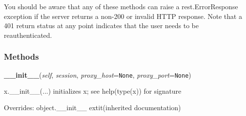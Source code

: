 You should be aware that any of these methods can raise a 
rest.ErrorResponse exception if the server returns a non-200 or invalid 
HTTP response. Note that a 401 return status at any point indicates that 
the user needs to be reauthenticated.



  \subsubsection{Methods}

    \vspace{0.5ex}

\hspace{.8\funcindent}\begin{boxedminipage}{\funcwidth}

    \raggedright \textbf{\_\_init\_\_}(\textit{self}, \textit{session}, \textit{proxy\_host}={\tt None}, \textit{proxy\_port}={\tt None})

\setlength{\parskip}{2ex}
    x.\_\_init\_\_(...) initializes x; see help(type(x)) for signature

\setlength{\parskip}{1ex}
      Overrides: object.\_\_init\_\_ 	extit{(inherited documentation)}

    \end{boxedminipage}

    \label{lib:dropbox:DropboxClient:request}

    \vspace{0.5ex}

